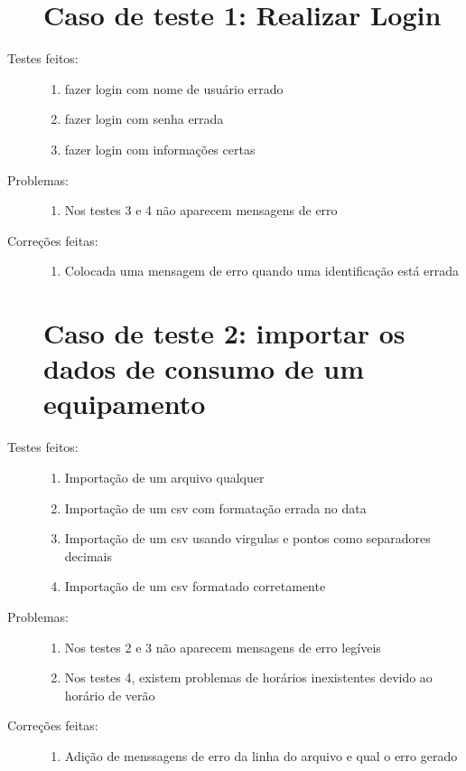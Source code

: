 \begin{description}
  \section{Caso de teste 1: Realizar Login}
  \item[Testes feitos:]
  \begin{enumerate}
    \item{fazer login com nome de usuário errado}
    \item{fazer login com senha errada}
    \item{fazer login com informações certas}
  \end{enumerate}
  \item[Problemas:]
  \begin{enumerate}
    \item{Nos testes 3 e 4 não aparecem mensagens de erro}
  \end{enumerate}
  \item[Correções feitas:]
  \begin{enumerate}
    \item{Colocada uma mensagem de erro quando uma identificação está errada}
  \end{enumerate}

  \section{Caso de teste 2: importar os dados de consumo de um equipamento}
  \item[Testes feitos:]
  \begin{enumerate}
    \item{Importação de um arquivo qualquer}
    \item{Importação de um csv com formatação errada no data}
    \item{Importação de um csv usando virgulas e pontos como separadores decimais}
    \item{Importação de um csv formatado corretamente}
  \end{enumerate}
  \item[Problemas:]
  \begin{enumerate}
    \item{Nos testes 2 e 3 não aparecem mensagens de erro legíveis}
    \item{Nos testes 4, existem problemas de horários inexistentes devido ao horário de verão}
  \end{enumerate}
  \item[Correções feitas:]
  \begin{enumerate}
    \item{Adição de menssagens de erro da linha do arquivo e qual o erro gerado}
  \end{enumerate}


\end{description}

